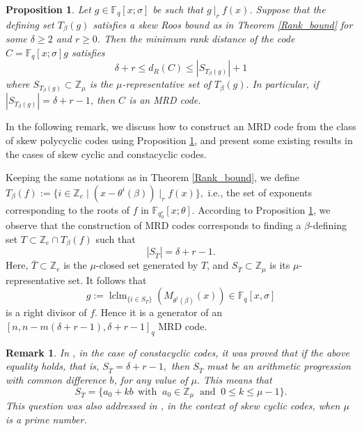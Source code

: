 \documentclass[12pt,paper]{article}
\newcommand{\hlc}[2][yellow]{ {\sethlcolor{#1} \hl{#2}} }
\theoremstyle{plain}
\newtheorem{proposition}[theorem]{Proposition}
\newtheorem{remark}[theorem]{Remark}
\newcommand{\Fq}{\mathbb{F}_{q}}
\DeclareMathOperator{\lclm}{lclm}
\begin{document}
\begin{proposition}\label{SKEW_MRD}
 Let $g \in \mathbb{F}_q[x; \sigma]$ be such that $g ~|_r~ f(x)$. 
 Suppose that the defining set $T_\beta(g)$ satisfies a skew Roos bound as in Theorem \ref{Rank_bound} for some $\delta \geq 2$ and $r \geq 0$. Then the minimum rank distance of the code $C=\mathbb{F}_{q}[x;\sigma] g$ satisfies $$\delta+r \leq d_R(C) \leq \left| S_{T_{\beta}(g)} \right|+1$$ where $  S_{T_{\beta}(g)} \subset \mathbb{Z}_{\mu} $ is the $\mu$-representative set of $T_{\beta}(g).$ 
 In particular, if $\left|  S_{T_{\beta}(g)} \right|=\delta+r-1$, then $ C$ is an MRD code.
\end{proposition}

In the following remark, we discuss how to construct an MRD code from the class of skew polycyclic codes using Proposition \ref{SKEW_MRD}, and present some existing results in the cases of skew cyclic and constacyclic codes.


Keeping the same notations as in Theorem \ref{Rank_bound}, we define
$T_{\beta}(f) := \{ i \in \mathbb{Z}_e \mid (x - \theta^i(\beta)) \mid_r f(x) \}, $ i.e., the set of exponents corresponding to the roots of $f$ in $\mathbb{F}_{q_0^e}[x;\theta]$.
According to Proposition \ref{SKEW_MRD}, we observe that the construction of MRD codes corresponds to finding a $\beta$-defining set $T \subset \mathbb{Z}_e \cap T_{\beta}(f)$ such that
$$|S_{\overline{T}}| = \delta + r - 1. $$ Here, $\overline{T} \subset \mathbb{Z}_e$ is the $\mu$-closed set generated by $T$, and $S_{\overline{T}} \subset \mathbb{Z}_{\mu}$ is its $\mu$-representative set. It follows that $$ g:= \lclm_{ \{ i\in S_{\overline{T}} \}}\left( M_{\theta^i(\beta)}(x)\right)  \in \Fq[x, \sigma] $$
is a right divisor of $f. $ Hence it is a generator of  an $[n, n-m(\delta + r - 1), \delta + r - 1]_q $ MRD code. 
\begin{remark}
In \cite[Theorem 5.2.7]{Cathryn2024}, in the case of constacyclic codes, it was proved that if the above equality holds, that is, $ S_{\overline{T}} = \delta + r - 1, $
then $S_{\overline{T}}$ must be an arithmetic progression with common difference $b$, for any value of $\mu.$ This means that
$$ S_{\overline{T}} =\{ a_0+ k b\ ~\text{with }~ a_0 \in \mathbb{Z}_{\mu} ~\text{ and }~ 0\leq k\leq \mu-1 \}.$$
This question was also addressed in \cite[Proposition 30]{Alfarano2021}, in the context of skew cyclic codes, when $\mu$ is a prime number.
\end{remark}
\end{document}
